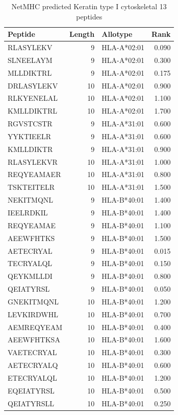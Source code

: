 \documentclass[12pt,]{book}
\begin{document}
\begin{table}

\caption{\label{tab:ker-peps}NetMHC predicted Keratin type I cytoskeletal 13 peptides}
\centering
\begin{tabular}[t]{lrlr}
\toprule
Peptide & Length & Allotype & Rank\\
\midrule
RLASYLEKV & 9 & HLA-A*02:01 & 0.090\\
SLNEELAYM & 9 & HLA-A*02:01 & 0.300\\
MLLDIKTRL & 9 & HLA-A*02:01 & 0.175\\
DRLASYLEKV & 10 & HLA-A*02:01 & 0.900\\
RLKYENELAL & 10 & HLA-A*02:01 & 1.100\\
\addlinespace
KMLLDIKTRL & 10 & HLA-A*02:01 & 1.700\\
RGVSTCSTR & 9 & HLA-A*31:01 & 0.600\\
YYKTIEELR & 9 & HLA-A*31:01 & 0.600\\
KMLLDIKTR & 9 & HLA-A*31:01 & 0.900\\
RLASYLEKVR & 10 & HLA-A*31:01 & 1.000\\
\addlinespace
REQYEAMAER & 10 & HLA-A*31:01 & 0.800\\
TSKTEITELR & 10 & HLA-A*31:01 & 1.500\\
NEKITMQNL & 9 & HLA-B*40:01 & 1.400\\
IEELRDKIL & 9 & HLA-B*40:01 & 1.400\\
REQYEAMAE & 9 & HLA-B*40:01 & 1.100\\
\addlinespace
AEEWFHTKS & 9 & HLA-B*40:01 & 1.500\\
AETECRYAL & 9 & HLA-B*40:01 & 0.015\\
TECRYALQL & 9 & HLA-B*40:01 & 0.150\\
QEYKMLLDI & 9 & HLA-B*40:01 & 0.800\\
QEIATYRSL & 9 & HLA-B*40:01 & 0.050\\
\addlinespace
GNEKITMQNL & 10 & HLA-B*40:01 & 1.200\\
LEVKIRDWHL & 10 & HLA-B*40:01 & 0.700\\
AEMREQYEAM & 10 & HLA-B*40:01 & 0.400\\
AEEWFHTKSA & 10 & HLA-B*40:01 & 1.600\\
VAETECRYAL & 10 & HLA-B*40:01 & 0.300\\
\addlinespace
AETECRYALQ & 10 & HLA-B*40:01 & 0.600\\
ETECRYALQL & 10 & HLA-B*40:01 & 1.200\\
EQEIATYRSL & 10 & HLA-B*40:01 & 0.500\\
QEIATYRSLL & 10 & HLA-B*40:01 & 0.250\\
\bottomrule
\end{tabular}
\end{table}
\end{document}
